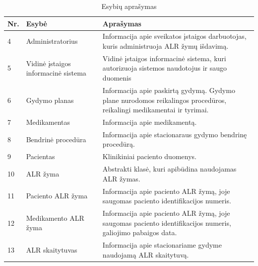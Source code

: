 \begin{table}[ht!]
    \centering
    \renewcommand{\arraystretch}{1.2}
    \renewcommand\thetable{7}

    \begin{tabular}{|m{3em}|m{12em}|m{22em}|}
    \hline 
    \rowcolor[HTML]{EFEFEF} 
    Nr. & Esybė & Aprašymas \\ \hline

    4  &  Administratorius  & Informacija apie sveikatos įstaigos darbuotojas, kuris administruoja ALR žymų išdavimą.       \\ \hline
    5  &  Vidinė įstaigos informacinė sistema  & Vidinė įstaigos informacinė sistema, kuri autorizuoja sistemos naudotojus ir saugo duomenis \\ \hline
    6  &  Gydymo planas  & Informacija apie paskirtą gydymą. Gydymo plane nurodomos reikalingos procedūros, reikalingi medikamentai ir tyrimai.       \\ \hline
    7  &  Medikamentas  & Informacija apie medikamentą.       \\ \hline
    8  &  Bendrinė procedūra  & Informacija apie stacionaraus gydymo bendrinę procedūrą.       \\ \hline
    9  &  Pacientas  & Klinikiniai paciento duomenys.       \\ \hline
    10  &  ALR žyma  & Abstrakti klasė, kuri apibūdina naudojamas ALR žymas.    \\ \hline
    11  &  Paciento ALR žyma  & Informacija apie paciento ALR žymą, joje saugomas paciento identifikacijos numeris.    \\ \hline
    12  &  Medikamento ALR žyma  & Informacija apie paciento ALR žymą, joje saugomas paciento identifikacijos numeris, galiojimo pabaigos data.    \\ \hline
    13  &  ALR skaitytuvas  & Informacija apie stacionariame gydyme naudojamą ALR skaitytuvą. \\ \hline


    \end{tabular}
    \caption{Esybių aprašymas} 

\end{table}

